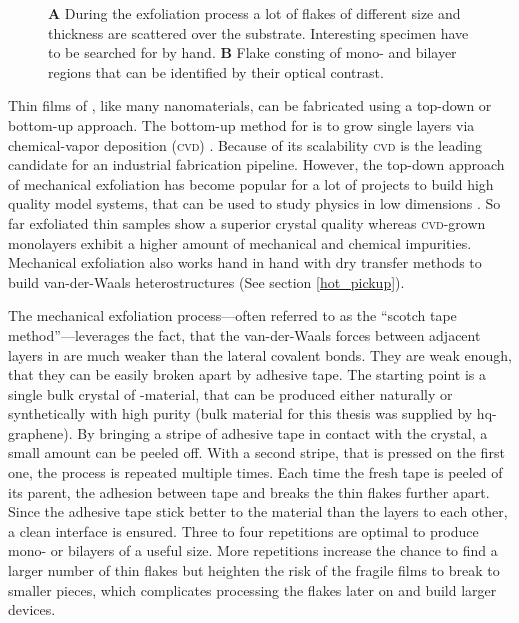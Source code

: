 \begin{figure}
\begin{subfigure}{0.349\textwidth}
\end{subfigure}
\caption{\textbf{A} During the exfoliation process a lot of flakes of different size and thickness are scattered over the substrate. Interesting specimen have to be searched for by hand. \textbf{B} Flake consting of mono- and bilayer regions that can be identified by their optical contrast.}
	\label{flakes}
\end{figure}

Thin films of \tmds\!, like many nanomaterials, can be fabricated using a top-down or bottom-up approach. The bottom-up method for \tmds is to grow single layers via chemical-vapor deposition (\textsc{cvd}) \cite{chen_chemical_2016}. Because of its scalability \textsc{cvd} is the leading candidate for an industrial fabrication pipeline. However, the top-down approach of mechanical exfoliation has become popular for a lot of projects to build high quality model systems, that can be used to study physics in low dimensions \cite{geim_rise_2007}. So far exfoliated thin \tmdg samples show a superior crystal quality whereas \textsc{cvd}-grown monolayers exhibit a higher amount of mechanical and chemical impurities. Mechanical exfoliation also works hand in hand with dry transfer methods to build van-der-Waals heterostructures (See section \ref{hot_pickup}). 

The mechanical exfoliation process---often referred to as the ``scotch tape method''---leverages the fact, that the van-der-Waals forces between adjacent layers in \tmds are much weaker than the lateral covalent bonds. They are weak enough, that they can be easily broken apart by adhesive tape. The starting point is a single bulk crystal of \tmd-material, that can be produced either naturally or synthetically with high purity (bulk material for this thesis was supplied by hq-graphene). By bringing a stripe of adhesive tape in contact with the crystal, a small amount can be peeled off. With a second stripe, that is pressed on the first one, the process is repeated multiple times. Each time the fresh tape is peeled of its parent, the adhesion between tape and \tmdg breaks the thin flakes further apart. Since the adhesive tape stick better to the material than the layers to each other, a clean interface is ensured. Three to four repetitions are optimal to produce mono- or bilayers of a useful size. More repetitions increase the chance to find a larger number of thin flakes but heighten the risk of the fragile films to break to smaller pieces, which complicates processing the flakes later on and build larger devices. 

